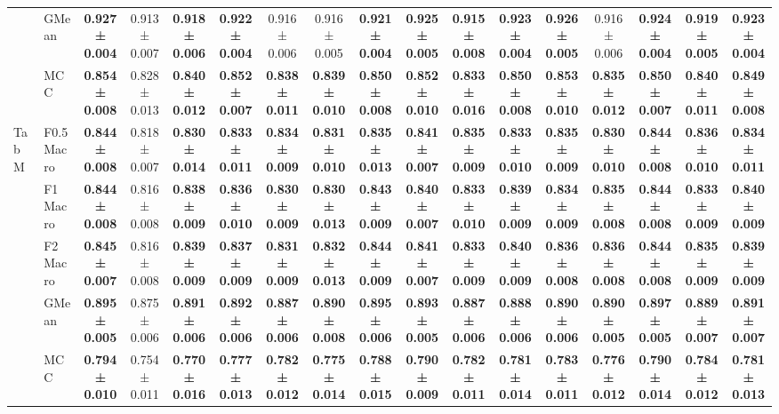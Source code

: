 \begin{table}[H]
{\begin{tabular}{llccccccccccccccc}
 & GMean & \textbf{0.927 ± 0.004} & 0.913 ± 0.007 & \textbf{0.918 ± 0.006} & \textbf{0.922 ± 0.004} & 0.916 ± 0.006 & 0.916 ± 0.005 & \textbf{0.921 ± 0.004} & \textbf{0.925 ± 0.005} & \textbf{0.915 ± 0.008} & \textbf{0.923 ± 0.004} & \textbf{0.926 ± 0.005} & 0.916 ± 0.006 & \textbf{0.924 ± 0.004} & \textbf{0.919 ± 0.005} & \textbf{0.923 ± 0.004} \\
 & MCC & \textbf{0.854 ± 0.008} & 0.828 ± 0.013 & \textbf{0.840 ± 0.012} & \textbf{0.852 ± 0.007} & \textbf{0.838 ± 0.011} & \textbf{0.839 ± 0.010} & \textbf{0.850 ± 0.008} & \textbf{0.852 ± 0.010} & \textbf{0.833 ± 0.016} & \textbf{0.850 ± 0.008} & \textbf{0.853 ± 0.010} & \textbf{0.835 ± 0.012} & \textbf{0.850 ± 0.007} & \textbf{0.840 ± 0.011} & \textbf{0.849 ± 0.008} \\
\cline{1-17}
\multirow[t]{5}{*}{TabM} & F0.5 Macro & \textbf{0.844 ± 0.008} & 0.818 ± 0.007 & \textbf{0.830 ± 0.014} & \textbf{0.833 ± 0.011} & \textbf{0.834 ± 0.009} & \textbf{0.831 ± 0.010} & \textbf{0.835 ± 0.013} & \textbf{0.841 ± 0.007} & \textbf{0.835 ± 0.009} & \textbf{0.833 ± 0.010} & \textbf{0.835 ± 0.009} & \textbf{0.830 ± 0.010} & \textbf{0.844 ± 0.008} & \textbf{0.836 ± 0.010} & \textbf{0.834 ± 0.011} \\
 & F1 Macro & \textbf{0.844 ± 0.008} & 0.816 ± 0.008 & \textbf{0.838 ± 0.009} & \textbf{0.836 ± 0.010} & \textbf{0.830 ± 0.009} & \textbf{0.830 ± 0.013} & \textbf{0.843 ± 0.009} & \textbf{0.840 ± 0.007} & \textbf{0.833 ± 0.010} & \textbf{0.839 ± 0.009} & \textbf{0.834 ± 0.009} & \textbf{0.835 ± 0.008} & \textbf{0.844 ± 0.008} & \textbf{0.833 ± 0.009} & \textbf{0.840 ± 0.009} \\
 & F2 Macro & \textbf{0.845 ± 0.007} & 0.816 ± 0.008 & \textbf{0.839 ± 0.009} & \textbf{0.837 ± 0.009} & \textbf{0.831 ± 0.009} & \textbf{0.832 ± 0.013} & \textbf{0.844 ± 0.009} & \textbf{0.841 ± 0.007} & \textbf{0.833 ± 0.009} & \textbf{0.840 ± 0.009} & \textbf{0.836 ± 0.008} & \textbf{0.836 ± 0.008} & \textbf{0.844 ± 0.008} & \textbf{0.835 ± 0.009} & \textbf{0.839 ± 0.009} \\
 & GMean & \textbf{0.895 ± 0.005} & 0.875 ± 0.006 & \textbf{0.891 ± 0.006} & \textbf{0.892 ± 0.006} & \textbf{0.887 ± 0.006} & \textbf{0.890 ± 0.008} & \textbf{0.895 ± 0.006} & \textbf{0.893 ± 0.005} & \textbf{0.887 ± 0.006} & \textbf{0.888 ± 0.006} & \textbf{0.890 ± 0.006} & \textbf{0.890 ± 0.005} & \textbf{0.897 ± 0.005} & \textbf{0.889 ± 0.007} & \textbf{0.891 ± 0.007} \\
 & MCC & \textbf{0.794 ± 0.010} & 0.754 ± 0.011 & \textbf{0.770 ± 0.016} & \textbf{0.777 ± 0.013} & \textbf{0.782 ± 0.012} & \textbf{0.775 ± 0.014} & \textbf{0.788 ± 0.015} & \textbf{0.790 ± 0.009} & \textbf{0.782 ± 0.011} & \textbf{0.781 ± 0.014} & \textbf{0.783 ± 0.011} & \textbf{0.776 ± 0.012} & \textbf{0.790 ± 0.014} & \textbf{0.784 ± 0.012} & \textbf{0.781 ± 0.013} \\

\end{tabular}}
\end{table}
